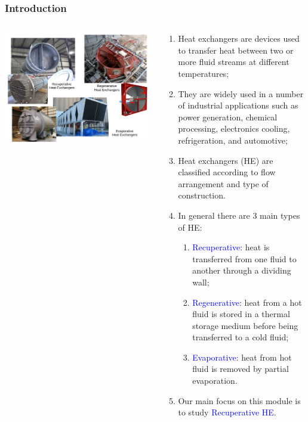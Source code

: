 \documentclass[10pt,compress]{beamer}
\newcommand{\blue}{\textcolor{blue}}
\begin{document}
\begin{frame}
 \frametitle{Introduction}
    \begin{columns}
       \begin{column}[l]{0.58\linewidth}
         \includegraphics[width=1.1\columnwidth,clip]{./Pics/HeatExchangers_Examples}
       \end{column}
       \begin{column}[l]{0.42\linewidth}
          \begin{enumerate}\scriptsize
              \item<1-> Heat exchangers are devices used to transfer heat between two or more fluid streams at different temperatures;
              \item<2-> They are widely used in a number of industrial applications such as power generation, chemical processing, electronics cooling, refrigeration, and automotive;
              \item<3-> Heat exchangers (HE) are classified according to flow arrangement and type of construction.
              \item<3-> In general there are 3 main types of HE:
                \begin{enumerate}\scriptsize
                  \item<3-> \blue{Recuperative}: heat is transferred from one fluid to another through a dividing wall;
                  \item<3-> \blue{Regenerative}: heat from a hot fluid is stored in a thermal storage medium before being transferred to a cold fluid;
                  \item<3-> \blue{Evaporative}: heat from hot fluid is removed by partial evaporation.
                \end{enumerate}
               \item<4-> Our main focus on this module is to study \blue{Recuperative HE}.
          \end{enumerate}
       \end{column}      
    \end{columns}
\end{frame}
\end{document}
